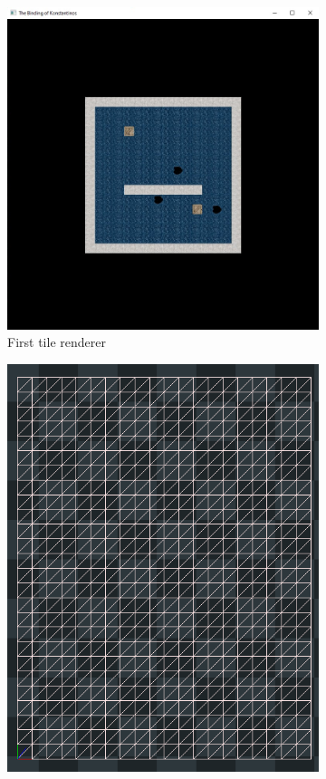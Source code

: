 \documentclass{article}
\begin{document}
\begin{figure}[H]
\centering
\begin{subfigure}{.30\textwidth}
  \centering
  \includegraphics[width=0.9\linewidth]{images/firstRender.png}
  \caption{First tile renderer}
  \label{fig:sub1}
\end{subfigure}%
\begin{subfigure}{.30\textwidth}
  \centering
  \includegraphics[width=0.65\linewidth]{images/gridRender.png}

\end{subfigure}
\end{figure}
\end{document}
